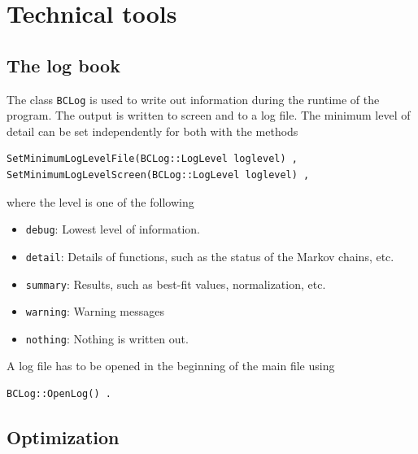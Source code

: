 \documentclass[11pt, a4paper]{article}
\begin{document}

\pagebreak 

\section{Technical tools} 
\label{section:tools} 


\subsection{The log book} 

The class \verb|BCLog| is used to write out information during the
runtime of the program. The output is written to screen and to a log
file. The minimum level of detail can be set independently for both 
with the methods 
%
\begin{verbatim} 
SetMinimumLogLevelFile(BCLog::LogLevel loglevel) , 
SetMinimumLogLevelScreen(BCLog::LogLevel loglevel) , 
\end{verbatim} 

\noindent 
where the level is one of the following 
%
\begin{itemize} 
\item \verb|debug|: Lowest level of information. 
\item \verb|detail|: Details of functions, such as the status of the Markov chains, etc. 
\item \verb|summary|: Results, such as best-fit values, normalization, etc. 
\item \verb|warning|: Warning messages 
\item \verb|nothing|: Nothing is written out. 
\end{itemize} 

A log file has to be opened in the beginning of the main file using 
%
\begin{verbatim} 
BCLog::OpenLog() . 
\end{verbatim} 


\subsection{Optimization} 
\label{subsection:optimization} 
\end{document}
